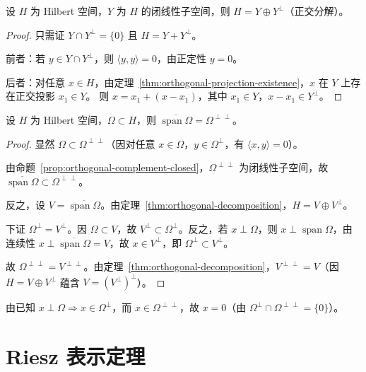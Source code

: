 \documentclass[lang=cn,a4paper,newtx,section]{elegantbook}
\begin{document}
\begin{theorem}[正交分解]\label{thm:orthogonal-decomposition}
  设 $H$ 为 Hilbert 空间，$Y$ 为 $H$ 的闭线性子空间，则 $H=Y\oplus Y^\perp$（正交分解）。
\end{theorem}

\begin{proof}
  只需证 $Y\cap Y^\perp=\{0\}$ 且 $H=Y+Y^\perp$。

  前者：若 $y\in Y\cap Y^\perp$，则 $\langle y,y\rangle=0$，由正定性 $y=0$。

  后者：对任意 $x\in H$，由定理~\ref{thm:orthogonal-projection-existence}，$x$ 在 $Y$ 上存在正交投影 $x_1\in Y$。
  则 $x=x_1+(x-x_1)$，其中 $x_1\in Y$，$x-x_1\in Y^\perp$。
\end{proof}

\begin{proposition}\label{prop:span-orthogonal-complement}
  设 $H$ 为 Hilbert 空间，$\Omega\subset H$，则 $\overline{\operatorname{span}\Omega}=\Omega^{\perp\perp}$。
\end{proposition}

\begin{proof}
  显然 $\Omega\subset\Omega^{\perp\perp}$（因对任意 $x\in\Omega$，$y\in\Omega^\perp$，有 $\langle x,y\rangle=0$）。

  由命题~\ref{prop:orthogonal-complement-closed}，$\Omega^{\perp\perp}$ 为闭线性子空间，故 $\overline{\operatorname{span}\Omega}\subset\Omega^{\perp\perp}$。

  反之，设 $V=\overline{\operatorname{span}\Omega}$。由定理~\ref{thm:orthogonal-decomposition}，$H=V\oplus V^\perp$。

  下证 $\Omega^\perp=V^\perp$。因 $\Omega\subset V$，故 $V^\perp\subset\Omega^\perp$。反之，若 $x\perp\Omega$，则 $x\perp\operatorname{span}\Omega$，由连续性 $x\perp\overline{\operatorname{span}\Omega}=V$，故 $x\in V^\perp$，即 $\Omega^\perp\subset V^\perp$。

  故 $\Omega^{\perp\perp}=V^{\perp\perp}$。由定理~\ref{thm:orthogonal-decomposition}，$V^{\perp\perp}=V$（因 $H=V\oplus V^\perp$ 蕴含 $V=(V^\perp)^\perp$）。
\end{proof}

\begin{remark}
  由已知 $x\perp\Omega\Rightarrow x\in\Omega^\perp$，而 $x\in\Omega^{\perp\perp}$，故 $x=0$（由 $\Omega^\perp\cap\Omega^{\perp\perp}=\{0\}$）。
\end{remark}

\section{Riesz 表示定理}
\end{document}
